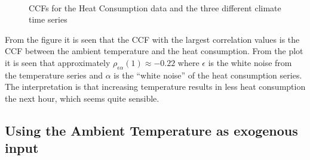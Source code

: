 \begin{figure}
    \centering
    \mbox{ \quad 
        \quad 
        }
    \caption{CCFs for the Heat Consumption data and the three different climate time series}
    \label{fig:ccfs}
\end{figure}

From the figure it is seen that the CCF with the largest correlation values is the CCF between the ambient temperature and the heat consumption. From the plot it is seen that approximately $\rho_{\epsilon\alpha}(1)\approx -0.22$ where $\epsilon$ is the white noise from the temperature series and $\alpha$ is the ``white noise'' of the heat consumption series. The interpretation is that increasing temperature results in less heat consumption the next hour, which seems quite sensible.

\subsection*{Using the Ambient Temperature as exogenous input}

